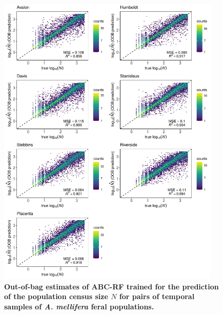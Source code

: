 \documentclass[a4paper, 12pt]{article}
\begin{document}
\begin{figure}[ht]
  \centering
  \includegraphics[width=0.95\textwidth]{Figures/FigureS15_combined_plot_nc.pdf}
  \small\caption{\textbf{Out-of-bag estimates of ABC-RF trained for the prediction of the population census size $N$ for pairs of temporal samples of \textit{A. mellifera} feral populations.}}
  \label{fig:supple_feralbee_N}
\end{figure}
\end{document}
